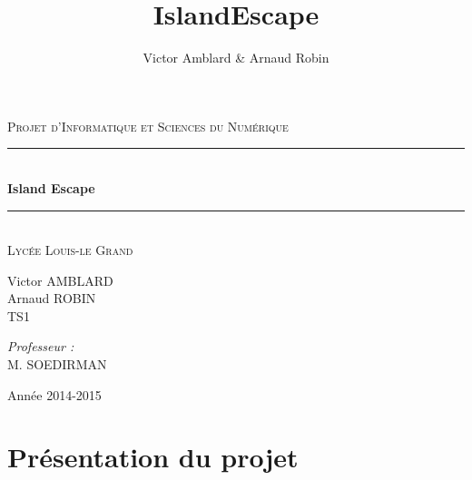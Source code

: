 \documentclass[12pt,a4paper]{report}
\title{IslandEscape}
\author{Victor Amblard & Arnaud Robin}
\newcommand{\HRule}{\rule{\linewidth}{0.5mm}}
\begin{document}
\begin{titlepage}

 \begin{sffamily}
  \begin{center}
    \textsc{\Large Projet d'Informatique et Sciences du Numérique}\\[1.5cm]
    \HRule \\[0.4cm]
    { \huge \bfseries Island Escape\\[0.4cm] }

    \HRule \\[2cm]
    
    \textsc{\LARGE Lycée Louis-le Grand}\\[2cm]
    
    \begin{minipage}{0.4\textwidth}
      \begin{flushleft} \large
        Victor \textsc{AMBLARD}\\
        Arnaud  \textsc{ROBIN}\\
        TS1\\
      \end{flushleft}
    \end{minipage}
    \begin{minipage}{0.3\textwidth}
      \begin{flushright} \large
        \emph{Professeur :}\\ M. SOEDIRMAN\\
      \end{flushright}
    \end{minipage}

    \vfill
       {\large Année 2014-2015}
  \end{center}
  \end{sffamily}
\end{titlepage}
\tableofcontents

\part{Présentation du projet}
\end{document}

